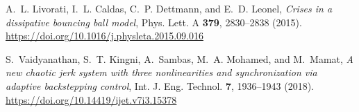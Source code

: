 \begin{thebibliography}{05}
A.~L. Livorati, I.~L. Caldas, C.~P. Dettmann, and E.~D. Leonel,
{\em Crises in a dissipative bouncing ball model},
Phys. Lett. A \textbf{379}, 2830--2838 
(2015).
\url{https://doi.org/10.1016/j.physleta.2015.09.016}

S.~Vaidyanathan, S.~T. Kingni, A.~Sambas, M.~A. Mohamed, and M.~Mamat,
{\em A new chaotic jerk system with three nonlinearities and synchronization via adaptive backstepping control},
Int. J. Eng. Technol. \textbf{7}, 1936--1943 
(2018).
\url{https://doi.org/10.14419/ijet.v7i3.15378
}



\end{thebibliography}